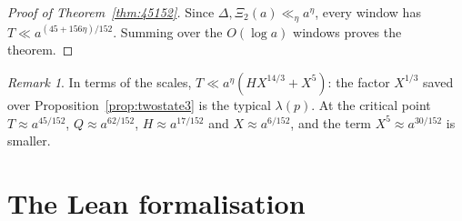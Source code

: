 \documentclass[11pt]{amsart}
\theoremstyle{definition}
\theoremstyle{remark}
\newtheorem{remark}[theorem]{Remark}
\begin{document}
\begin{proof}[Proof of Theorem~\ref{thm:45152}]
Since $\Delta,\Xi_2(a)\ll_\eta a^\eta$, every window has $T\ll a^{(45+156\eta)/152}$. Summing over
the $O(\log a)$ windows proves the theorem.
\end{proof}

\begin{remark}
In terms of the scales, $T\ll a^\eta(HX^{14/3}+X^5)$: the factor $X^{1/3}$ saved over
Proposition~\ref{prop:twostate3} is the typical $\lambda(p)$. At the critical point
$T\approx a^{45/152}$, $Q\approx a^{62/152}$, $H\approx a^{17/152}$ and $X\approx a^{6/152}$, and
the term $X^5\approx a^{30/152}$ is smaller.
\end{remark}

\section{The Lean formalisation}\label{sec:lean}
\end{document}
